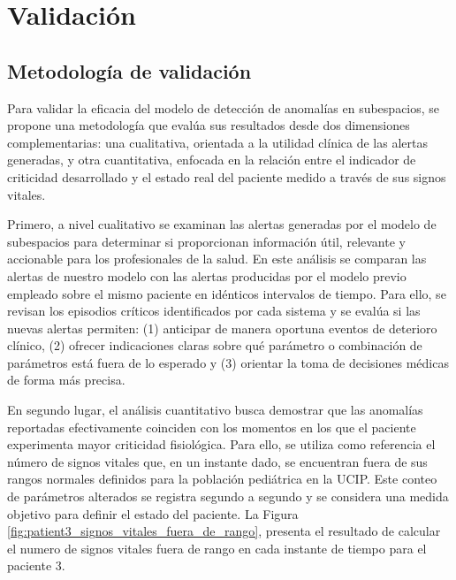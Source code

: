 \chapter{Validación}

\section{Metodología de validación}

Para validar la eficacia del modelo de detección de anomalías en subespacios, se propone una metodología que evalúa sus resultados desde dos dimensiones complementarias: una cualitativa, orientada a la utilidad clínica de las alertas generadas, y otra cuantitativa, enfocada en la relación entre el indicador de criticidad desarrollado y el estado real del paciente medido a través de sus signos vitales.

Primero, a nivel cualitativo se examinan las alertas generadas por el modelo de subespacios para determinar si proporcionan información útil, relevante y accionable para los profesionales de la salud. En este análisis se comparan las alertas de nuestro modelo con las alertas producidas por el modelo previo empleado sobre el mismo paciente en idénticos intervalos de tiempo. Para ello, se revisan los episodios críticos identificados por cada sistema y se evalúa si las nuevas alertas permiten: (1) anticipar de manera oportuna eventos de deterioro clínico, (2) ofrecer indicaciones claras sobre qué parámetro o combinación de parámetros está fuera de lo esperado y (3) orientar la toma de decisiones médicas de forma más precisa.

En segundo lugar, el análisis cuantitativo busca demostrar que las anomalías reportadas efectivamente coinciden con los momentos en los que el paciente experimenta mayor criticidad fisiológica. Para ello, se utiliza como referencia el número de signos vitales que, en un instante dado, se encuentran fuera de sus rangos normales definidos para la población pediátrica en la UCIP. Este conteo de parámetros alterados se registra segundo a segundo y se considera una medida objetivo para definir el estado del paciente. La Figura \ref{fig:patient3_signos_vitales_fuera_de_rango}, presenta el resultado de calcular el numero de signos vitales fuera de rango en cada instante de tiempo para el paciente 3.

